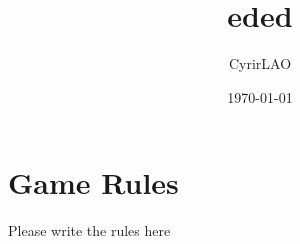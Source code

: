 \documentclass{article}%
\title{eded}%
\author{CyrirLAO}%
\date{\today}%
\begin{document}
%
\pagestyle{empty}%
\normalsize%
\maketitle%
\section{Game Rules}%
\label{sec:GameRules}%
Please write the rules here

%
\end{document}
